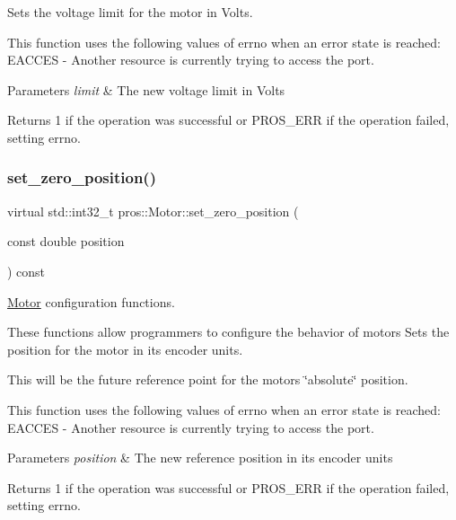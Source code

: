 Sets the voltage limit for the motor in Volts. 

This function uses the following values of errno when an error state is reached\+: E\+A\+C\+C\+ES -\/ Another resource is currently trying to access the port.


\begin{DoxyParams}{Parameters}
{\em limit} & The new voltage limit in Volts\\
\hline
\end{DoxyParams}
\begin{DoxyReturn}{Returns}
1 if the operation was successful or P\+R\+O\+S\+\_\+\+E\+RR if the operation failed, setting errno. 
\end{DoxyReturn}
\mbox{\label{classpros_1_1Motor_af20c036c1d5d68eb5e762c12f9a4b7fe}} 
\subsubsection{\texorpdfstring{set\_zero\_position()}{set\_zero\_position()}}
{\footnotesize\ttfamily virtual std\+::int32\+\_\+t pros\+::\+Motor\+::set\+\_\+zero\+\_\+position (\begin{DoxyParamCaption}\item[{const double}]{position }\end{DoxyParamCaption}) const\hspace{0.3cm}{\ttfamily [virtual]}}



\mbox{\hyperlink{classpros_1_1Motor}{Motor}} configuration functions. 

These functions allow programmers to configure the behavior of motors Sets the position for the motor in its encoder units.

This will be the future reference point for the motor\textquotesingle{}s \char`\"{}absolute\char`\"{} position.

This function uses the following values of errno when an error state is reached\+: E\+A\+C\+C\+ES -\/ Another resource is currently trying to access the port.


\begin{DoxyParams}{Parameters}
{\em position} & The new reference position in its encoder units\\
\hline
\end{DoxyParams}
\begin{DoxyReturn}{Returns}
1 if the operation was successful or P\+R\+O\+S\+\_\+\+E\+RR if the operation failed, setting errno. 
\end{DoxyReturn}
\mbox{\label{classpros_1_1Motor_a5d67803a65fa699a169a4ed5a107a964}} 
